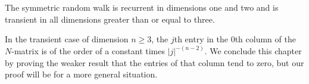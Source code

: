 The symmetric random walk is recurrent in dimensions one and two and is transient in all dimensions greater than or equal to three.

In the transient case of dimension $n \geq 3$, the $j$th entry in the 0th column of the $N$-matrix is of the order of a constant times $|j|^{-(n-2)}$. We conclude this chapter by proving the weaker result that the entries of that column tend to zero, but our proof will be for a more general situation.
